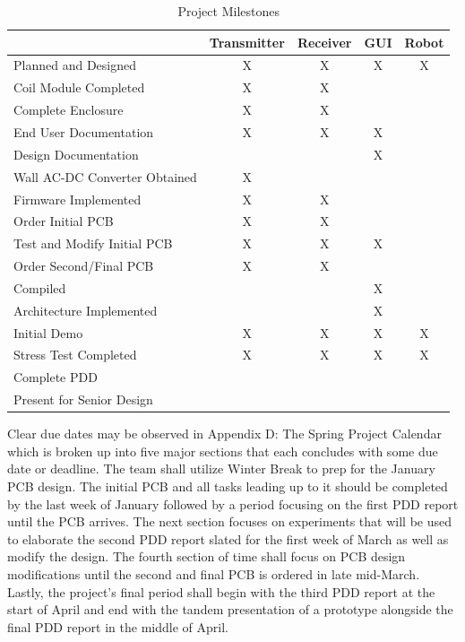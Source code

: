 \documentclass[12pt]{article}
\begin{document}
\begin{table}[h!]
\centering
\caption{Project Milestones}
\begin{tabular}{ | l  | c | c | c | c |}
\hline
& Transmitter & Receiver & GUI & Robot \\
\hline
Planned and Designed & X & X & X & X\\
\hline
Coil Module Completed & X & X &   &  \\
\hline
Complete Enclosure & X & X &   &  \\
\hline
End User Documentation & X & X & X &  \\
\hline
Design Documentation &  &   & X &   \\
\hline
Wall AC-DC Converter Obtained & X &   &   &  \\
\hline
Firmware Implemented & X & X &   &  \\
\hline
Order Initial PCB & X & X &   &  \\
\hline
Test and Modify Initial PCB & X & X & X &   \\
\hline
Order Second/Final PCB & X & X &   &  \\
\hline
Compiled &   &   & X &  \\
\hline
Architecture Implemented &   &   & X &  \\
\hline
Initial Demo & X & X & X & X\\
\hline
Stress Test Completed & X & X & X & X\\
\hline
Complete PDD &   &   &   &  \\
\hline
Present for Senior Design &   &   &   &  \\
\hline
\end{tabular}
\end{table}

\indent
Clear due dates may be observed in Appendix D: The Spring Project Calendar which is broken up into five major sections that each concludes with some due date or deadline.  The team shall utilize Winter Break to prep for the January PCB design.  The initial PCB and all tasks leading up to it should be completed by the last week of January followed by a period focusing on the first PDD report until the PCB arrives.  The next section focuses on experiments that will be used to elaborate the second PDD report slated for the first week of March as well as modify the design.  The fourth section of time shall focus on PCB design modifications until the second and final PCB is ordered in late mid-March.  Lastly, the project’s final period shall begin with the third PDD report at the start of April and end with the tandem presentation of a prototype alongside the final PDD report in the middle of April. \\
\end{document}
